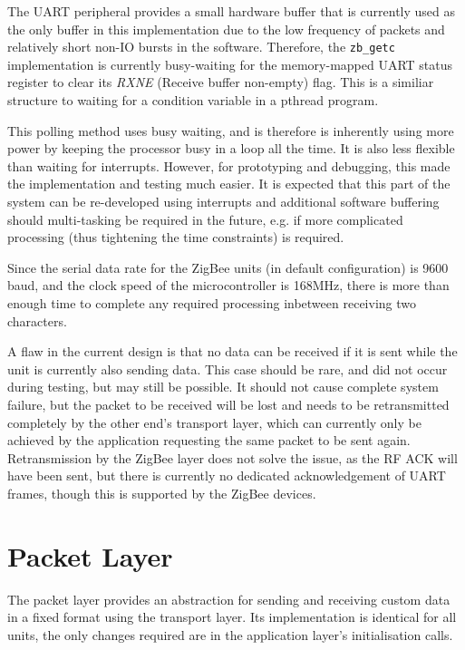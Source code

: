 The UART peripheral provides a small hardware buffer that is currently used as the only buffer in this implementation due to the low frequency of packets and relatively short non-IO bursts in the software. Therefore, the \texttt{zb\_getc} implementation is currently busy-waiting for the memory-mapped UART status register to clear its \emph{RXNE} (Receive buffer non-empty) flag. This is a similiar structure to waiting for a condition variable in a pthread program. %

This polling method uses busy waiting, and is therefore is inherently using more power by keeping the processor busy in a loop all the time. It is also less flexible than waiting for interrupts. However, for prototyping and debugging, this made the implementation and testing much easier. It is expected that this part of the system can be re-developed using interrupts and additional software buffering should multi-tasking be required in the future, e.g. if more complicated processing (thus tightening the time constraints) is required.

Since the serial data rate for the ZigBee units (in default configuration) is 9600 baud, and the clock speed of the microcontroller is 168MHz, there is more than enough time to complete any required processing inbetween receiving two characters.


A flaw in the current design is that no data can be received if it is sent while the unit is currently also sending data. This case should be rare, and did not occur during testing, but may still be possible. It should not cause complete system failure, but the packet to be received will be lost and needs to be retransmitted completely by the other end's transport layer, which can currently only be achieved by the application requesting the same packet to be sent again. Retransmission by the ZigBee layer does not solve the issue, as the RF ACK will have been sent, but there is currently no dedicated acknowledgement of UART frames, though this is supported by the ZigBee devices. %

\section{Packet Layer}
The packet layer provides an abstraction for sending and receiving custom data in a fixed format using the transport layer. Its implementation is identical for all units, the only changes required are in the application layer's initialisation calls.

